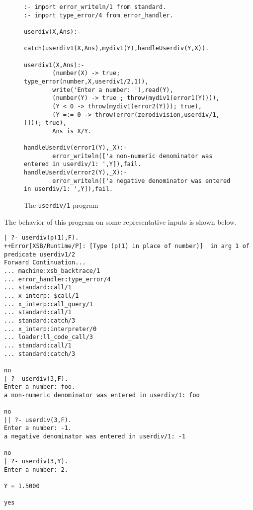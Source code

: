 \begin{figure}[hbtp]
\longline
\begin{small}
\begin{verbatim}
:- import error_writeln/1 from standard.
:- import type_error/4 from error_handler.

userdiv(X,Ans):- 
        catch(userdiv1(X,Ans),mydiv1(Y),handleUserdiv(Y,X)).

userdiv1(X,Ans):- 
        (number(X) -> true; type_error(number,X,userdiv1/2,1)),
        write('Enter a number: '),read(Y),
        (number(Y) -> true ; throw(mydiv1(error1(Y)))),
        (Y < 0 -> throw(mydiv1(error2(Y))); true),
        (Y =:= 0 -> throw(error(zerodivision,userdiv/1,[])); true),
        Ans is X/Y.

handleUserdiv(error1(Y),_X):- 
        error_writeln(['a non-numeric denominator was entered in userdiv/1: ',Y]),fail.
handleUserdiv(error2(Y),_X):- 
        error_writeln(['a negative denominator was entered in userdiv/1: ',Y]),fail.
\end{verbatim}
\end{small}
\caption{The {\tt userdiv/1} program} \label{fig:userdiv}
\longline
\end{figure}

The behavior of this program on some representative inputs is shown
below.

\begin{small}
\begin{verbatim}
| ?- userdiv(p(1),F).
++Error[XSB/Runtime/P]: [Type (p(1) in place of number)]  in arg 1 of predicate userdiv1/2
Forward Continuation...
... machine:xsb_backtrace/1
... error_handler:type_error/4
... standard:call/1
... x_interp:_$call/1
... x_interp:call_query/1
... standard:call/1
... standard:catch/3
... x_interp:interpreter/0
... loader:ll_code_call/3
... standard:call/1
... standard:catch/3

no
| ?- userdiv(3,F).
Enter a number: foo.
a non-numeric denominator was entered in userdiv/1: foo

no
|| ?- userdiv(3,F).
Enter a number: -1.
a negative denominator was entered in userdiv/1: -1

no
| ?- userdiv(3,Y).
Enter a number: 2.

Y = 1.5000

yes
\end{verbatim}
\end{small}

